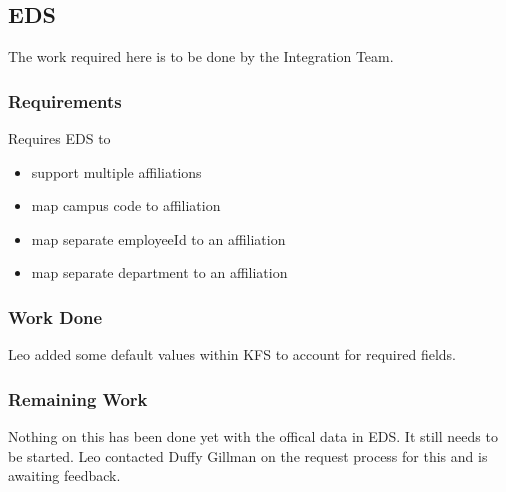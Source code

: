 \documentclass[12pt,notitlepage]{article}
\begin{document}
\subsection{EDS}
The work required here is to be done by the Integration Team. 

\subsubsection{Requirements}

Requires EDS to
\begin{itemize}
\item support multiple affiliations
\item map campus code to affiliation
\item map separate employeeId to an affiliation
\item map separate department to an affiliation
\end{itemize}

\subsubsection{Work Done}
Leo added some default values within KFS to account for required fields. 

\subsubsection{Remaining Work}
Nothing on this has been done yet with the offical data in EDS. It still needs to be started. 
Leo contacted Duffy Gillman on the request process for this and is awaiting feedback.
\end{document}
